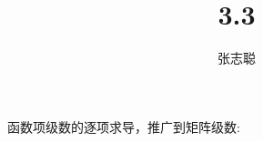 \documentclass{article}
\begin{document}
\title{3.3}
\author{张志聪}
\maketitle

\begin{zremark}
  函数项级数的逐项求导，推广到矩阵级数:
\end{zremark}
\end{document}
